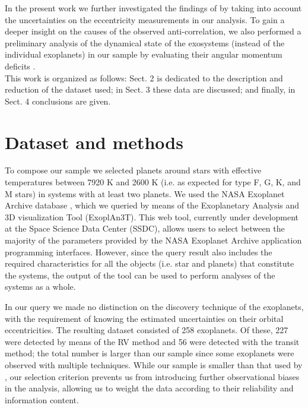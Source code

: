 \documentclass[letter]{aa} %
\begin{document}
In the present work we further investigated the findings of \cite{limbach} by taking into account the uncertainties on the eccentricity measurements in our analysis. To gain a deeper insight on the causes of the observed anti-correlation, we also performed a preliminary analysis of the dynamical state of the exosystems (instead of the individual exoplanets) in our sample by evaluating their angular momentum deficits \citep{AMD}.\\
This work is organized as follows: Sect. 2 is dedicated to the description and reduction of the dataset used; in Sect. 3 these data are discussed; and finally, in Sect. 4 conclusions are given.
        
        
        \section{Dataset and methods}

        To compose our sample we selected planets around stars with effective temperatures between 7920 K and 2600 K (i.e. as expected for type F, G, K, and M stars) in systems with at least two planets. We used the NASA Exoplanet Archive database \citep{caltech}, which we queried by means of the Exoplanetary Analysis and 3D visualization Tool (ExoplAn3T). This web tool, currently under development at the Space Science Data Center (SSDC), allows users to select between the majority of the parameters provided by the NASA Exoplanet Archive application programming interfaces. However, since the query result also includes the required characteristics for all the objects (i.e. star and planets) that constitute the systems, the output of the tool can be used to perform analyses of the systems as a whole.
                
In our query we made no distinction on the discovery technique of the exoplanets, with the requirement of knowing the estimated uncertainties on their orbital eccentricities. The resulting dataset consisted of 258 exoplanets. Of these, 227 were detected by means of the RV method and 56 were detected with the transit method; the total number is larger than our sample since some exoplanets were observed with multiple techniques. While our sample is smaller than that used by \cite{limbach}, our selection criterion prevents us from introducing further observational biases in the analysis, allowing us to weight the data according to their reliability and information content.
\end{document}
